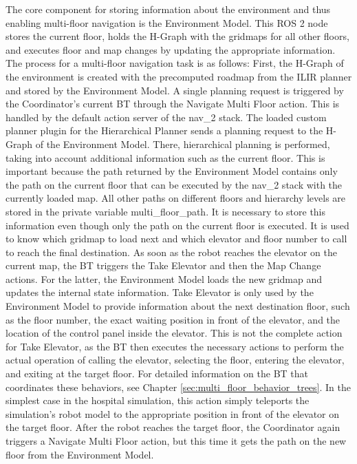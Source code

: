 The core component for storing information about the environment and thus enabling multi-floor navigation is the Environment Model. This ROS 2 node stores the current floor, holds the H-Graph with the gridmaps for all other floors, and executes floor and map changes by updating the appropriate information. The process for a multi-floor navigation task is as follows: First, the H-Graph of the environment is created with the precomputed roadmap from the ILIR planner and stored by the Environment Model. A single planning request is triggered by the Coordinator's current BT through the Navigate Multi Floor action. This is handled by the default action server of the \gls{nav_2} stack. The loaded custom planner plugin for the Hierarchical Planner sends a planning request to the H-Graph of the Environment Model. There, hierarchical planning is performed, taking into account additional information such as the current floor. This is important because the path returned by the Environment Model contains only the path on the current floor that can be executed by the \gls{nav_2} stack with the currently loaded map. All other paths on different floors and hierarchy levels are stored in the private variable multi\_floor\_path. It is necessary to store this information even though only the path on the current floor is executed. It is used to know which gridmap to load next and which elevator and floor number to call to reach the final destination. As soon as the robot reaches the elevator on the current map, the BT triggers the Take Elevator and then the Map Change actions. For the latter, the Environment Model loads the new gridmap and updates the internal state information. Take Elevator is only used by the Environment Model to provide information about the next destination floor, such as the floor number, the exact waiting position in front of the elevator, and the location of the control panel inside the elevator. This is not the complete action for Take Elevator, as the BT then executes the necessary actions to perform the actual operation of calling the elevator, selecting the floor, entering the elevator, and exiting at the target floor. For detailed information on the BT that coordinates these behaviors, see Chapter \ref{sec:multi_floor_behavior_trees}. In the simplest case in the hospital simulation, this action simply teleports the simulation's robot model to the appropriate position in front of the elevator on the target floor. After the robot reaches the target floor, the Coordinator again triggers a Navigate Multi Floor action, but this time it gets the path on the new floor from the Environment Model.

